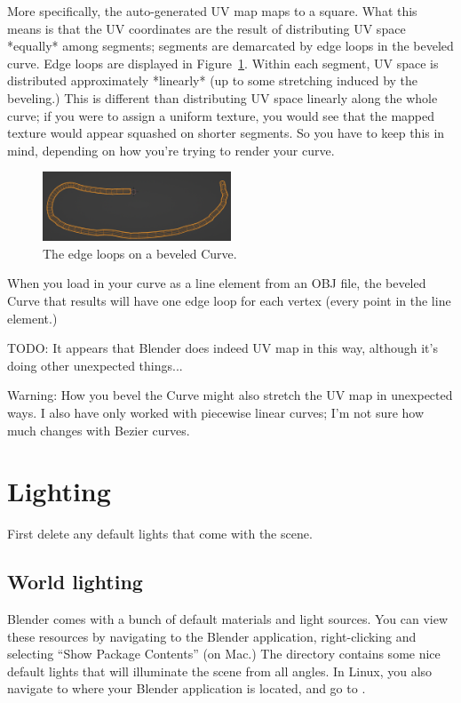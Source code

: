 \documentclass[10pt]{article}
\begin{document}
More specifically, the auto-generated UV map maps to a square. What this means is that the UV coordinates are the result of distributing UV space *equally* among segments; segments are demarcated by edge loops in the beveled curve. Edge loops are displayed in Figure~\ref{fig:curve_edge_loops}. Within each segment, UV space is distributed approximately *linearly* (up to some stretching induced by the beveling.) This is different than distributing UV space linearly along the whole curve; if you were to assign a uniform texture, you would see that the mapped texture would appear squashed on shorter segments. So you have to keep this in mind, depending on how you're trying to render your curve.
\begin{figure}[H]
    \centering
    \includegraphics[width=0.5\textwidth]{images/curve_edge_loops.png}
    \caption{The edge loops on a beveled Curve.}
    \label{fig:curve_edge_loops}
\end{figure}
When you load in your curve as a line element from an OBJ file, the beveled Curve that results will have one edge loop for each vertex (every point in the line element.)

TODO: It appears that Blender does indeed UV map in this way, although it's doing other unexpected things...

Warning: How you bevel the Curve might also stretch the UV map in unexpected ways. I also have only worked with piecewise linear curves; I'm not sure how much changes with Bezier curves.

\section{Lighting}
\label{sec:Lighting}
First delete any default lights that come with the scene.

\subsection{World lighting}
Blender comes with a bunch of default materials and light sources. You can view these resources by navigating to the Blender application, right-clicking and selecting ``Show Package Contents'' (on Mac.) The directory  contains some nice default lights that will illuminate the scene from all angles. In Linux, you also navigate to where your Blender application is located, and go to .
\end{document}
